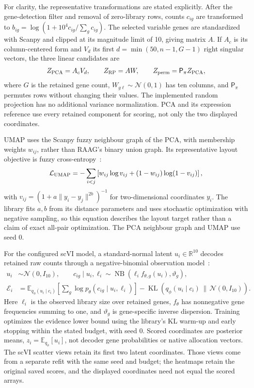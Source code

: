 \documentclass[11pt]{article}
\begin{document}
For clarity, the representative transformations are stated explicitly. After the gene-detection filter and removal of zero-library rows, counts $c_{ig}$ are transformed to $b_{ig}=\log(1+10^4c_{ig}/\sum_gc_{ig})$. The selected variable genes are standardized with Scanpy and clipped at its magnitude limit of 10, giving matrix $A$. If $A_c$ is its column-centered form and $V_d$ its first $d=\min(50,n-1,G-1)$ right singular vectors, the three linear candidates are
\begin{equation}
 Z_{\rm PCA}=A_cV_d,\qquad Z_{\rm RP}=AW,\qquad Z_{\rm perm}=\mathsf P_\pi Z_{\rm PCA},
\end{equation}
where $G$ is the retained gene count, $W_{g\ell}\sim\mathcal N(0,1)$ has ten columns, and $\mathsf P_\pi$ permutes rows without changing their values. The implemented random projection has no additional variance normalization. PCA and its expression reference use every retained component for scoring, not only the two displayed coordinates.

UMAP uses the Scanpy fuzzy neighbour graph of the PCA, with membership weights $w_{ij}$, rather than RAAG's binary union graph. Its representative layout objective is fuzzy cross-entropy~\cite{mcinnes2018umap}:
\begin{equation}
 \mathcal L_{\rm UMAP}=-\sum_{i<j}\left[w_{ij}\log v_{ij}+(1-w_{ij})\log(1-v_{ij})\right],
\end{equation}
with $v_{ij}=(1+a\lVert y_i-y_j\rVert^{2b})^{-1}$ for two-dimensional coordinates $y_i$. The library fits $a,b$ from its distance parameters and uses stochastic optimization with negative sampling, so this equation describes the layout target rather than a claim of exact all-pair optimization. The PCA neighbour graph and UMAP use seed 0.

For the configured scVI model, a standard-normal latent $u_i\in\mathbb R^{10}$ decodes retained raw counts through a negative-binomial observation model~\cite{lopez2018scvi,gayoso2022scvitools}:
\begin{align}
 u_i&\sim\mathcal N(0,I_{10}),\qquad c_{ig}\mid u_i,\ell_i\sim\operatorname{NB}(\ell_i f_{\theta,g}(u_i),\vartheta_g),\\
 \mathcal E_i&=\mathbb E_{q_\phi(u_i\mid c_i)}\!\left[\sum_g\log p_\theta(c_{ig}\mid u_i,\ell_i)\right]
 -\operatorname{KL}\!\left(q_\phi(u_i\mid c_i)\,\|\,\mathcal N(0,I_{10})\right).
\end{align}
Here $\ell_i$ is the observed library size over retained genes, $f_\theta$ has nonnegative gene frequencies summing to one, and $\vartheta_g$ is gene-specific inverse dispersion. Training optimizes the evidence lower bound using the library's KL warm-up and early stopping within the stated budget, with seed 0. Scored coordinates are posterior means, $z_i=\mathbb E_{q_\phi}[u_i]$, not decoder gene probabilities or native allocation vectors. The scVI scatter views retain its first two latent coordinates. Those views come from a separate refit with the same seed and budget; the heatmaps retain the original saved scores, and the displayed coordinates need not equal the scored arrays.
\end{document}
